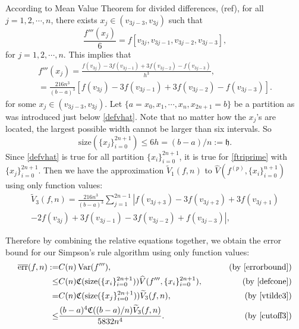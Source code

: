 \documentclass{iitthesis}
\DeclareMathOperator{\Var}{Var}
\theoremstyle{definition}
\theoremstyle{remark}
\begin{document}


According to Mean Value Theorem for divided differences, (ref), for all $j=1,2,\cdots,n$, there exists $x_j\in (v_{3j-3},v_{3j})$ such that
\begin{equation*}
    \frac{f'''(x_j)}{6}=f[v_{3j},v_{3j-1},v_{3j-2},v_{3j-3}],
\end{equation*}
for $j = 1, 2, \cdots, n.$ This implies that
\begin{multline}\label{ftriprime}
  f'''(x_j)=\frac{f(v_{3j})-3f(v_{3j-1})+3f(v_{3j-2})-f(v_{3j-3})}{h^3},\\=\frac{216n^3}{(b-a)^3}[f(v_{3j})-3f(v_{3j-1})+3f(v_{3j-2})-f(v_{3j-3})].
\end{multline}
for some $x_j\in (v_{3j-3},v_{3j})$. Let $\{a=x_{0}, x_{1},\cdots,x_{n},x_{2n+1}=b\}$ be a partition as was introduced just below \eqref{defvhat}. Note that no matter how the $x_j$'s are located, the largest possible width cannot be larger than six intervals. So
\begin{equation}\label{cutoff3}
    \text{size}(\{x_j\}_{i=0}^{2n+1})\leq 6h=(b-a)/n:=\mathfrak{h}.
\end{equation}
Since \eqref{defvhat} is true for all partition $\{x_i\}_{i=0}^{2n+1}$, it is true for \eqref{ftriprime} with $\{x_j\}_{i=0}^{2n+1}$. Then we have the approximation $\widetilde{V}_1(f,n)$ to $\widehat{V}(f^{(p)},\{x_i\}_{i=0}^{n+1})$ using only function values:
\begin{multline}\label{vtilde3}
\widetilde{V}_3(f,n)=\frac{216n^3}{(b-a)^3}\sum_{j=1}^{2n-1}\left|f(v_{3j+3})-3f(v_{3j+2})+3f(v_{3j+1})\right.\\\left.-2f(v_{3j})+3f(v_{3j-1})-3f(v_{3j-2})+f(v_{3j-3})\right|,
\end{multline}

Therefore by combining the relative equations together, we obtain the error bound for our Simpson's rule algorithm using only function values:
\begin{align*}
\overline{\text{err}}(f,n):=&C(n)\Var(f'''),\qquad &\text{ (by \eqref{errorbound})}\\
\leq & C(n)\mathfrak{C}(\text{size}(\{x_i\}_{i=0}^{2n+1}))\widehat{V}(f''',\{x_i\}_{i=0}^{2n+1}), \qquad &\text{ (by \eqref{defcone})}\\
=& C(n)\mathfrak{C}(\text{size}(\{x_j\}_{i=0}^{2n+1}))\widetilde{V}_3(f,n), \qquad &\text{ (by \eqref{vtilde3})}\\
  \leq & \frac{(b-a)^4\mathfrak{C}((b-a)/n)\widetilde{V}_3(f,n)}{5832n^4}.\qquad &\text{ (by \eqref{cutoff3})}
\end{align*}
\end{document}
